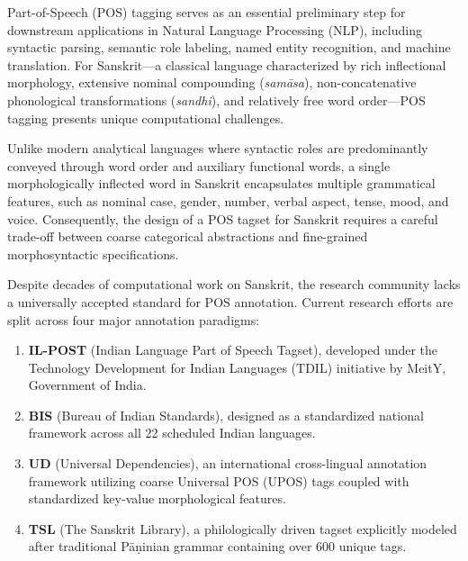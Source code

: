 \documentclass[11pt,a4paper]{article}
\begin{document}
Part-of-Speech (POS) tagging serves as an essential preliminary step for downstream applications in Natural Language Processing (NLP), including syntactic parsing, semantic role labeling, named entity recognition, and machine translation. For Sanskrit---a classical language characterized by rich inflectional morphology, extensive nominal compounding (\textit{sam\=asa}), non-concatenative phonological transformations (\textit{sandhi}), and relatively free word order---POS tagging presents unique computational challenges. 

Unlike modern analytical languages where syntactic roles are predominantly conveyed through word order and auxiliary functional words, a single morphologically inflected word in Sanskrit encapsulates multiple grammatical features, such as nominal case, gender, number, verbal aspect, tense, mood, and voice. Consequently, the design of a POS tagset for Sanskrit requires a careful trade-off between coarse categorical abstractions and fine-grained morphosyntactic specifications.

Despite decades of computational work on Sanskrit, the research community lacks a universally accepted standard for POS annotation. Current research efforts are split across four major annotation paradigms:
\begin{enumerate}[leftmargin=1.5em, itemsep=0.2em]
    \item \textbf{IL-POST} (Indian Language Part of Speech Tagset), developed under the Technology Development for Indian Languages (TDIL) initiative by MeitY, Government of India.
    \item \textbf{BIS} (Bureau of Indian Standards), designed as a standardized national framework across all 22 scheduled Indian languages.
    \item \textbf{UD} (Universal Dependencies), an international cross-lingual annotation framework utilizing coarse Universal POS (UPOS) tags coupled with standardized key-value morphological features.
    \item \textbf{TSL} (The Sanskrit Library), a philologically driven tagset explicitly modeled after traditional P\=a\d{n}inian grammar containing over 600 unique tags.
\end{enumerate}
\end{document}
